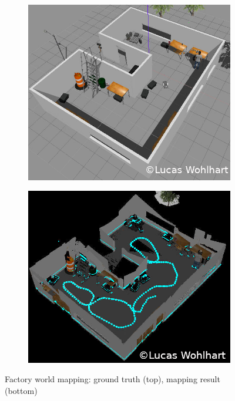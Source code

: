 \documentclass[10pt,journal,compsoc]{IEEEtran}
\begin{document}
\begin{figure}
    \centering
    \begin{subfigure}[b]{0.45\textwidth}
        \includegraphics[width=\linewidth]{img/factory_map_ground_truth.png}
        \label{fig:factory_map_ground_truth}
    \end{subfigure}
    
    \begin{subfigure}[b]{0.45\textwidth}
        \includegraphics[width=\linewidth]{img/factory_map.png}
        \label{fig:factory_map}
    \end{subfigure}
    \caption{Factory world mapping: ground truth (top), mapping result (bottom)}    
\end{figure}
\end{document}
